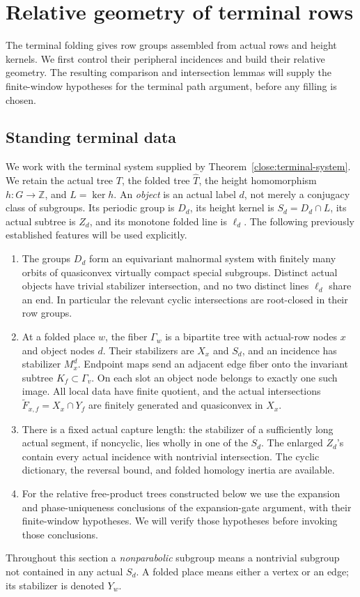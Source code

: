 \section{Relative geometry of terminal rows}\label{sec:07-transfer}

The terminal folding gives row groups assembled from actual rows and
height kernels. We first control their peripheral incidences and build
their relative geometry. The resulting comparison and intersection
lemmas will supply the finite-window hypotheses for the terminal path
argument, before any filling is chosen.

\subsection{Standing terminal data}

We work with the terminal system supplied by Theorem~\ref{close:terminal-system}. We retain the actual tree \(T\), the folded tree \(\widehat T\), the height homomorphism \(h:G\to\mathbb Z\), and \(L=\ker h\). An \emph{object} is an actual label \(d\), not merely a conjugacy class of subgroups. Its periodic group is \(D_d\), its height kernel is \(S_d=D_d\cap L\), its actual subtree is \(Z_d\), and its monotone folded line is \(\ell_d\). The following previously established features will be used explicitly.
\begin{enumerate}[label=(\roman*)]
\item The groups \(D_d\) form an equivariant malnormal system with finitely many orbits of quasiconvex virtually compact special subgroups. Distinct actual objects have trivial stabilizer intersection, and no two distinct lines \(\ell_d\) share an end. In particular the relevant cyclic intersections are root-closed in their row groups.
\item At a folded place \(w\), the fiber \(\Gamma_w\) is a bipartite tree with actual-row nodes \(x\) and object nodes \(d\). Their stabilizers are \(X_x\) and \(S_d\), and an incidence has stabilizer \(M_x^d\). Endpoint maps send an adjacent edge fiber onto the invariant subtree \(K_f\subset\Gamma_v\). On each slot an object node belongs to exactly one such image. All local data have finite quotient, and the actual intersections \(\widetilde F_{x,f}=X_x\cap Y_f\) are finitely generated and quasiconvex in \(X_x\).
\item There is a fixed actual capture length: the stabilizer of a sufficiently long actual segment, if noncyclic, lies wholly in one of the \(S_d\). The enlarged \(Z_d\)'s contain every actual incidence with nontrivial intersection. The cyclic dictionary, the reversal bound, and folded homology inertia are available.
\item For the relative free-product trees constructed below we use the expansion and phase-uniqueness conclusions of the expansion-gate argument, with their finite-window hypotheses. We will verify those hypotheses before invoking those conclusions.
\end{enumerate}
Throughout this section a \emph{nonparabolic} subgroup means a nontrivial subgroup not contained in any actual \(S_d\). A folded place means either a vertex or an edge; its stabilizer is denoted \(Y_w\).

